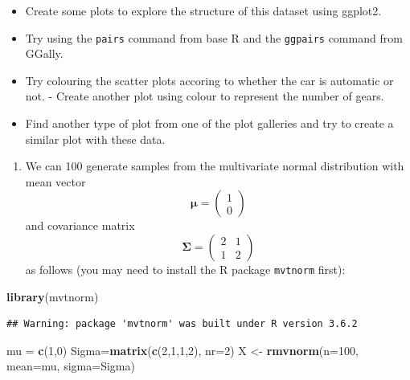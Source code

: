 \documentclass[]{book}
\newenvironment{Shaded}{\begin{snugshade}}{\end{snugshade}}
\newcommand{\DataTypeTok}[1]{\textcolor[rgb]{0.13,0.29,0.53}{#1}}
\newcommand{\DecValTok}[1]{\textcolor[rgb]{0.00,0.00,0.81}{#1}}
\newcommand{\KeywordTok}[1]{\textcolor[rgb]{0.13,0.29,0.53}{\textbf{#1}}}
\newcommand{\NormalTok}[1]{#1}
\newcommand{\StringTok}[1]{\textcolor[rgb]{0.31,0.60,0.02}{#1}}
\providecommand{\tightlist}{%
  \setlength{\itemsep}{0pt}\setlength{\parskip}{0pt}}
\theoremstyle{definition}
\theoremstyle{definition}
\theoremstyle{definition}
\theoremstyle{remark}
\begin{document}
\begin{itemize}
\tightlist
\item
  Create some plots to explore the structure of this dataset using ggplot2.
\item
  Try using the \texttt{pairs} command from base R and the \texttt{ggpairs} command from GGally.
\item
  Try colouring the scatter plots accoring to whether the car is automatic or not. - Create another plot using colour to represent the number of gears.
\item
  Find another type of plot from one of the plot galleries and try to create a similar plot with these data.
\end{itemize}

\begin{enumerate}
\def\labelenumi{\arabic{enumi}.}
\setcounter{enumi}{3}
\tightlist
\item
  We can 100 generate samples from the multivariate normal distribution with mean vector
  \[{\boldsymbol{\mu}}= \left(\begin{array}{c}1\\0\end{array}\right)\]
  and covariance matrix
  \[\boldsymbol{\Sigma}= \left(\begin{array}{cc}2&1\\1&2\end{array}\right)\]
  as follows (you may need to install the R package \texttt{mvtnorm} first):
\end{enumerate}

\begin{Shaded}
\begin{Highlighting}[]
\KeywordTok{library}\NormalTok{(mvtnorm)}
\end{Highlighting}
\end{Shaded}

\begin{verbatim}
## Warning: package 'mvtnorm' was built under R version 3.6.2
\end{verbatim}

\begin{Shaded}
\begin{Highlighting}[]
\NormalTok{mu =}\StringTok{ }\KeywordTok{c}\NormalTok{(}\DecValTok{1}\NormalTok{,}\DecValTok{0}\NormalTok{)}
\NormalTok{Sigma=}\KeywordTok{matrix}\NormalTok{(}\KeywordTok{c}\NormalTok{(}\DecValTok{2}\NormalTok{,}\DecValTok{1}\NormalTok{,}\DecValTok{1}\NormalTok{,}\DecValTok{2}\NormalTok{), }\DataTypeTok{nr=}\DecValTok{2}\NormalTok{)}
\NormalTok{X <-}\StringTok{ }\KeywordTok{rmvnorm}\NormalTok{(}\DataTypeTok{n=}\DecValTok{100}\NormalTok{, }\DataTypeTok{mean=}\NormalTok{mu, }\DataTypeTok{sigma=}\NormalTok{Sigma)}
\end{Highlighting}
\end{Shaded}
\end{document}
